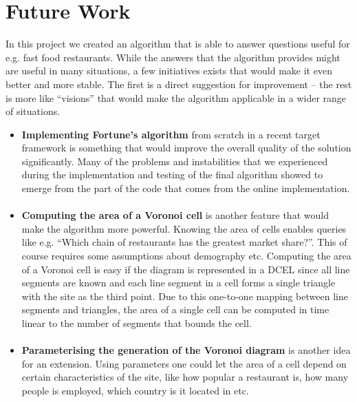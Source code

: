\section{Future Work}

In this project we created an algorithm that is able to answer questions useful for e.g. fast food restaurants. While the answers that the algorithm provides might are useful in many situations, a few initiatives exists that would make it even better and more stable. The first is a direct suggestion for improvement – the rest is more like “visions” that would make the algorithm applicable in a wider range of situations.

\begin{itemize}
	\item \textbf{Implementing Fortune's algorithm} from scratch in a recent target framework is something that would improve the overall quality of the solution significantly. Many of the problems and instabilities that we experienced during the implementation and testing of the final algorithm showed to emerge from the part of the code that comes from the online implementation.

	\paragraph{}
	\item \textbf{Computing the area of a Voronoi cell} is another feature that would make the algorithm more powerful. Knowing the area of cells enables queries like e.g. “Which chain of restaurants has the greatest market share?”. This of course requires some assumptions about demography etc. Computing the area of a Voronoi cell is easy if the diagram is represented in a DCEL since all line segments are known and each line segment in a cell forms a single triangle with the site as the third point. Due to this one-to-one mapping between line segments and triangles, the area of a single cell can be computed in time linear to the number of segments that bounds the cell.
	\paragraph{}
	\item \textbf{Parameterising the generation of the Voronoi diagram} is another idea for an extension. Using parameters one could let the area of a cell depend on certain characteristics of the site, like how popular a restaurant is, how many people is employed, which country is it located in etc.
\end{itemize}


